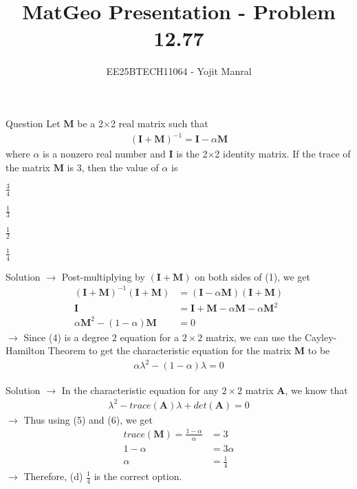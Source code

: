 \documentclass{beamer}
\title{MatGeo Presentation - Problem 12.77}
\author{EE25BTECH11064 - Yojit Manral}
\date{}
\numberwithin{equation}{section}
\theoremstyle{remark}
\let\vec\mathbf
\begin{document}
\frame{\titlepage}
\begin{frame}{Question}
Let $\vec{M}$ be a 2$\times$2 real matrix such that
\begin{align}
    (\vec{I}+\vec{M})^{-1} = \vec{I}-\alpha\vec{M}
\end{align}
where $\alpha$ is a nonzero real number and $\vec{I}$ is the 2$\times$2 identity matrix. If the trace of the matrix $\vec{M}$ is $3$, then the value of $\alpha$ is
\begin{enumerate}[label=(\alph*)]
\begin{multicols}{4}
    \item $\frac{3}{4}$
    \item $\frac{1}{3}$
    \item $\frac{1}{2}$
    \item $\frac{1}{4}$
\end{multicols}
\end{enumerate}
\end{frame}

\begin{frame}{Solution}
$\rightarrow$ Post-multiplying by $(\vec{I}+\vec{M})$ on both sides of (1), we get
\begin{align}
    (\vec{I}+\vec{M})^{-1}(\vec{I}+\vec{M}) &= (\vec{I}-\alpha\vec{M})(\vec{I}+\vec{M}) \\
    \vec{I} &= \vec{I} + \vec{M} -\alpha\vec{M} - \alpha\vec{M}^2 \\
    \alpha\vec{M}^2 - (1-\alpha)\vec{M} &= 0
\end{align}
$\rightarrow$ Since (4) is a degree $2$ equation for a $2\times2$ matrix, we can use the Cayley-Hamilton Theorem to get the characteristic equation for the matrix $\vec{M}$ to be
\begin{align}
    \alpha\lambda^2 - (1-\alpha)\lambda = 0
\end{align}
\end{frame}

\begin{frame}{Solution}
$\rightarrow$ In the characteristic equation for any $2\times2$ matrix $\vec{A}$, we know that
\begin{align}
    \lambda^2 - trace(\vec{A})\lambda + det(\vec{A}) = 0
\end{align}
$\rightarrow$ Thus using (5) and (6), we get
\begin{align}
    trace(\vec{M}) = \frac{1-\alpha}{\alpha} &= 3 \\
    1 - \alpha &= 3\alpha \\
    \alpha &= \frac{1}{4}
\end{align}
$\rightarrow$ Therefore, (d) $\frac{1}{4}$ is the correct option.
\end{frame}
\end{document}
